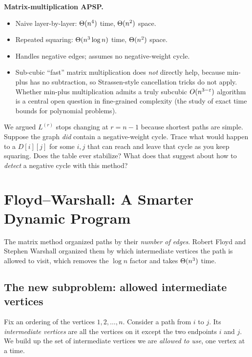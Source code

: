 \begin{complexitybox}
\textbf{Matrix-multiplication APSP.}
\begin{itemize}
\item Naive layer-by-layer: $\Theta(n^4)$ time, $\Theta(n^2)$ space.
\item Repeated squaring: $\Theta(n^3 \log n)$ time, $\Theta(n^2)$ space.
\item Handles negative edges; assumes no negative-weight cycle.
\item Sub-cubic ``fast'' matrix multiplication does \emph{not} directly help,
because min-plus has no subtraction, so Strassen-style cancellation tricks do
not apply. Whether min-plus multiplication admits a truly subcubic
$O(n^{3-\varepsilon})$ algorithm is a central open question in fine-grained
complexity (the study of exact time bounds for polynomial problems).

\end{itemize}
\end{complexitybox}

\begin{walkbox}
We argued $L^{(r)}$ stops changing at $r = n-1$ because shortest paths are
simple. Suppose the graph \emph{did} contain a negative-weight cycle. Trace
what would happen to a $D[i][j]$ for some $i, j$ that can reach and leave that
cycle as you keep squaring. Does the table ever stabilize? What does that
suggest about how to \emph{detect} a negative cycle with this method?
\end{walkbox}

\section{Floyd--Warshall: A Smarter Dynamic Program}
\label{ch25:floyd}

The matrix method organized paths by their \emph{number of edges}. Robert Floyd
and Stephen Warshall organized them by which intermediate vertices the path is allowed to visit, which
removes the $\log n$ factor and takes $\Theta(n^3)$ time.

\subsection{The new subproblem: allowed intermediate vertices}

Fix an ordering of the vertices $1, 2, \dots, n$. Consider a path from $i$ to
$j$. Its \emph{intermediate vertices} are all the vertices on it except the two
endpoints $i$ and $j$. We build up the set of intermediate vertices
we are \emph{allowed to use}, one vertex at a time.

